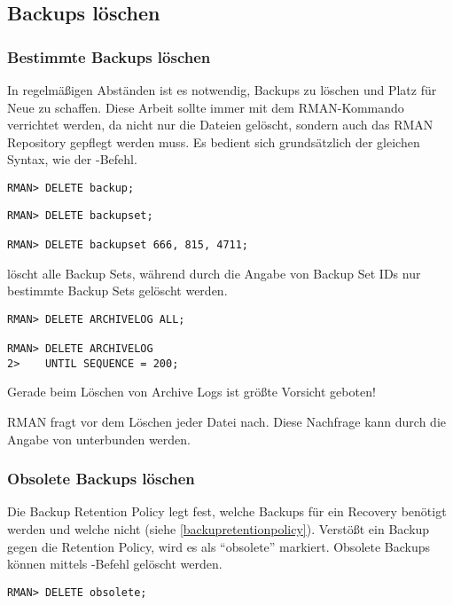       \subsection{Backups l\"oschen}
        \label{deletingbackups}
        \subsubsection{Bestimmte Backups l\"oschen}
          In regelm\"a\ss{}igen Abst\"anden ist es notwendig, Backups zu l\"oschen und Platz f\"ur Neue zu schaffen. Diese Arbeit sollte immer mit dem RMAN-Kommando  verrichtet werden, da nicht nur die Dateien gel\"oscht, sondern auch das RMAN Repository gepflegt werden muss. Es bedient sich grunds\"atzlich der gleichen Syntax, wie der -Befehl.
          \begin{lstlisting}[caption=Alle vorhandenen Backups l\"oschen,label=admin1338,language=rman]
RMAN> DELETE backup;
          \end{lstlisting}
          \begin{lstlisting}[caption=Nur Backup Sets l\"oschen,label=admin1339,language=rman]
RMAN> DELETE backupset;

RMAN> DELETE backupset 666, 815, 4711;
          \end{lstlisting}
           l\"oscht alle Backup Sets, w\"ahrend durch die Angabe von Backup Set IDs nur bestimmte Backup Sets gel\"oscht werden.
          \begin{lstlisting}[caption=Archive Logs l\"oschen,label=admin1340,language=rman]
RMAN> DELETE ARCHIVELOG ALL;

RMAN> DELETE ARCHIVELOG
2>    UNTIL SEQUENCE = 200;
          \end{lstlisting}
          \begin{merke}
            Gerade beim L\"oschen von Archive Logs ist gr\"o\ss{}te Vorsicht geboten!
          \end{merke}
          RMAN fragt vor dem L\"oschen jeder Datei nach. Diese Nachfrage kann durch die Angabe von  unterbunden werden.
        \subsubsection{Obsolete Backups l\"oschen}
          Die Backup Retention Policy legt fest, welche Backups f\"ur ein Recovery ben\"otigt werden und welche nicht (siehe \ref{backupretentionpolicy}). Verst\"o\ss{}t ein Backup gegen die Retention Policy, wird es als \enquote{obsolete} markiert. Obsolete Backups k\"onnen mittels -Befehl gel\"oscht werden.
          \begin{lstlisting}[caption=Obsolete Backups l\"oschen,label=admin1341,language=rman]
RMAN> DELETE obsolete;
          \end{lstlisting}
